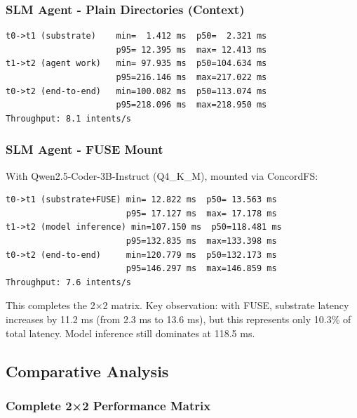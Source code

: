 \documentclass[11pt]{article}
\begin{document}
\subsubsection{SLM Agent - Plain Directories (Context)}

\begin{lstlisting}
t0->t1 (substrate)    min=  1.412 ms  p50=  2.321 ms
                      p95= 12.395 ms  max= 12.413 ms
t1->t2 (agent work)   min= 97.935 ms  p50=104.634 ms
                      p95=216.146 ms  max=217.022 ms
t0->t2 (end-to-end)   min=100.082 ms  p50=113.074 ms
                      p95=218.096 ms  max=218.950 ms
Throughput: 8.1 intents/s
\end{lstlisting}

\subsubsection{SLM Agent - FUSE Mount}

With Qwen2.5-Coder-3B-Instruct (Q4\_K\_M), mounted via ConcordFS:

\begin{lstlisting}
t0->t1 (substrate+FUSE) min= 12.822 ms  p50= 13.563 ms
                        p95= 17.127 ms  max= 17.178 ms
t1->t2 (model inference) min=107.150 ms  p50=118.481 ms
                        p95=132.835 ms  max=133.398 ms
t0->t2 (end-to-end)     min=120.779 ms  p50=132.173 ms
                        p95=146.297 ms  max=146.859 ms
Throughput: 7.6 intents/s
\end{lstlisting}

This completes the 2×2 matrix. Key observation: with FUSE, substrate latency increases by 11.2 ms (from 2.3 ms to 13.6 ms), but this represents only 10.3\% of total latency. Model inference still dominates at 118.5 ms.

\subsection{Comparative Analysis}

\subsubsection{Complete 2×2 Performance Matrix}
\end{document}
